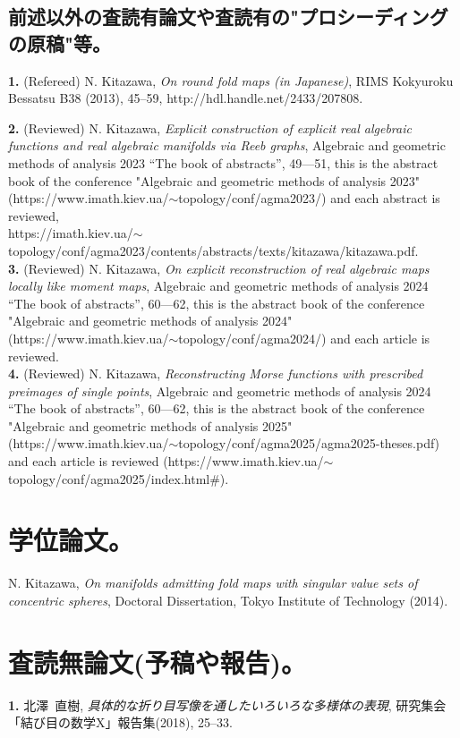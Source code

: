 \documentclass{article}
\begin{document}
\subsection{前述以外の査読有論文や査読有の"プロシーディングの原稿"等。}
\par\noindent
{\bf 1.} (Refereed) N. Kitazawa, \textsl{On round fold maps {\rm (}in Japanese{\rm )}}, RIMS Kokyuroku Bessatsu B38 (2013), 45--59, http://hdl.handle.net/2433/207808.
\par\noindent
{\bf 2.} (Reviewed) N. Kitazawa, \textsl{Explicit construction of explicit real algebraic functions and real algebraic manifolds via Reeb graphs}, Algebraic and geometric methods of analysis 2023 “The book of abstracts”, 49—51, this is the abstract book of the conference "Algebraic and geometric methods of analysis 2023"\\
(https://www.imath.kiev.ua/$\sim$topology/conf/agma2023/) and each abstract is reviewed,\\
https://imath.kiev.ua/$\sim$topology/conf/agma2023/contents/abstracts/texts/kitazawa/kitazawa.pdf. \\
{\bf 3.} (Reviewed) N. Kitazawa, \textsl{On explicit reconstruction of real algebraic maps locally like moment maps}, Algebraic and geometric methods of analysis 2024 “The book of abstracts”, 60—62, this is the abstract book of the conference "Algebraic and geometric methods of analysis 2024"\\
(https://www.imath.kiev.ua/$\sim$topology/conf/agma2024/) and each article is reviewed.\\
{\bf 4.} (Reviewed) N. Kitazawa,  \textsl{Reconstructing Morse functions with prescribed preimages of single points}, Algebraic and geometric methods of analysis 2024 “The book of abstracts”, 60—62, this is the abstract book of the conference "Algebraic and geometric methods of analysis 2025"\\  (https://www.imath.kiev.ua/$\sim$topology/conf/agma2025/agma2025-theses.pdf) and each article is reviewed (https://www.imath.kiev.ua/$\sim$topology/conf/agma2025/index.html\#).
\ \\
\section{学位論文。}
\par\noindent
N. Kitazawa, \textsl{On manifolds admitting fold maps with singular value sets of concentric spheres}, Doctoral Dissertation, Tokyo Institute of Technology (2014).
\section{査読無論文(予稿や報告)。}
\par\noindent
{\bf 1.} 北澤\ 直樹, \textsl{具体的な折り目写像を通したいろいろな多様体の表現}, 研究集会「結び目の数学X」報告集(2018), 25--33.
\end{document}
